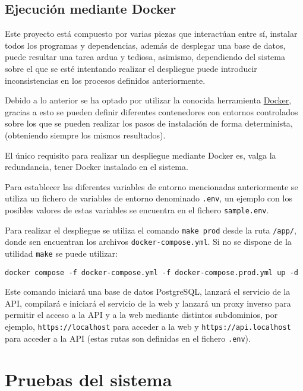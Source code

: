 \subsection{Ejecución mediante Docker}

Este proyecto está compuesto por varias piezas que interactúan entre sí,
instalar todos los programas y dependencias, además de desplegar una base de
datos, puede resultar una tarea ardua y tediosa, asimismo, dependiendo del
sistema sobre el que se esté intentando realizar el despliegue puede introducir
inconsistencias en los procesos definidos anteriormente.

Debido a lo anterior se ha optado por utilizar la conocida herramienta
\href{https://www.docker.com/}{Docker}, gracias a esto se pueden definir
diferentes contenedores con entornos controlados sobre los que se pueden
realizar los pasos de instalación de forma determinista, (obteniendo siempre los
mismos resultados).

El único requisito para realizar un despliegue mediante Docker es, valga la
redundancia, tener Docker instalado en el sistema.

Para establecer las diferentes variables de entorno mencionadas anteriormente se
utiliza un fichero de variables de entorno denominado \texttt{.env}, un ejemplo
con los posibles valores de estas variables se encuentra en el fichero
\texttt{sample.env}.

Para realizar el despliegue se utiliza el comando \texttt{make prod} desde la
ruta \texttt{/app/}, donde sen encuentran los archivos
\texttt{docker-compose.yml}. Si no se dispone de la utilidad \texttt{make} se
puede utilizar:

\texttt{docker compose -f docker-compose.yml -f docker-compose.prod.yml up -d}

Este comando iniciará una base de datos PostgreSQL, lanzará el servicio de la
API, compilará e iniciará el servicio de la web y lanzará un proxy inverso para
permitir el acceso a la API y a la web mediante distintos subdominios, por
ejemplo, \texttt{https://localhost} para acceder a la web y
\texttt{https://api.localhost} para acceder a la API (estas rutas son definidas
en el fichero \texttt{.env}).

\section{Pruebas del sistema}
